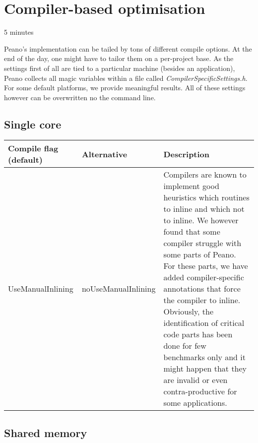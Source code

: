 \section{Compiler-based optimisation}

\chapterDescription
  {
    5 minutes
  }
  {
  }


Peano's implementation can be tailed by tons of different compile options. 
At the end of the day, one might have to tailor them on a per-project base. 
As the settings first of all are tied to a particular machine (besides an
application), Peano collects all magic variables within a file called
{\em CompilerSpecificSettings.h}.
For some default platforms, we provide meaningful results.
All of these settings however can be overwritten no the command line.


\subsection*{Single core}

\begin{center}
 \begin{tabular}{p{2cm}p{2cm}p{9.5cm}}
  Compile flag (default) & Alternative & Description \\
  \hline
  {\footnotesize Use\-Manual\-Inlining} 
  & 
  {\footnotesize noUse\-Manual\-Inlining} 
  &
  Compilers are known to implement good heuristics which routines to inline and
  which not to inline. We however found that some compiler struggle with some
  parts of Peano. For these parts, we have added compiler-specific annotations
  that force the compiler to inline. Obviously, the identification of critical
  code parts has been done for few benchmarks only and it might happen that they 
  are invalid or even contra-productive for some applications. 
  \\
  \hline
 \end{tabular}
\end{center}
  

\subsection*{Shared memory}

